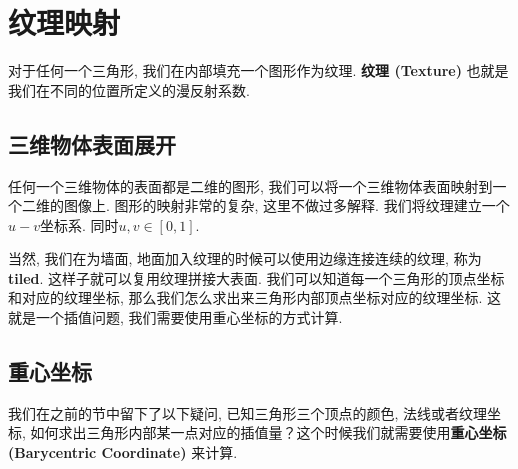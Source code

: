 \documentclass[openany]{progbookcn}
\begin{document}
\chapter{纹理映射}

对于任何一个三角形, 我们在内部填充一个图形作为纹理. \textbf{纹理 (Texture) }也就是我们在不同的位置所定义的漫反射系数. 

\section{三维物体表面展开}

任何一个三维物体的表面都是二维的图形, 我们可以将一个三维物体表面映射到一个二维的图像上. 图形的映射非常的复杂, 这里不做过多解释. 我们将纹理建立一个$u-v$坐标系. 同时$u,v\in[0,1]$. 

当然, 我们在为墙面, 地面加入纹理的时候可以使用边缘连接连续的纹理, 称为\textbf{tiled}. 这样子就可以复用纹理拼接大表面. 我们可以知道每一个三角形的顶点坐标和对应的纹理坐标, 那么我们怎么求出来三角形内部顶点坐标对应的纹理坐标. 这就是一个插值问题, 我们需要使用重心坐标的方式计算. 

\section{重心坐标}
我们在之前的节中留下了以下疑问, 已知三角形三个顶点的颜色, 法线或者纹理坐标, 如何求出三角形内部某一点对应的插值量？这个时候我们就需要使用\textbf{重心坐标 (Barycentric Coordinate) }来计算. 
\end{document}
